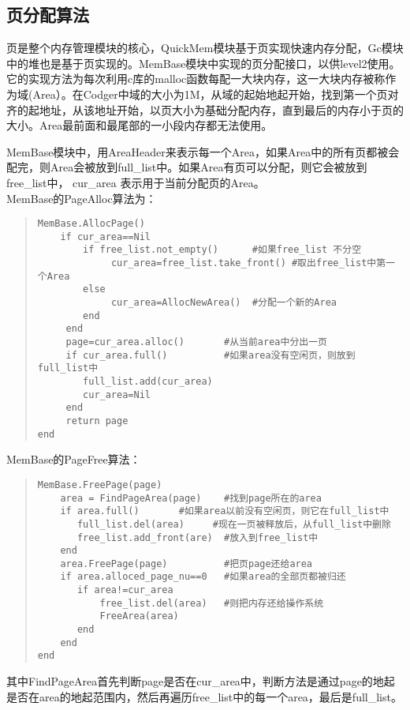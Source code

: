 \subsection{页分配算法}
页是整个内存管理模块的核心，QuickMem模块基于页实现快速内存分配，Gc模块中的堆也是基于页实现的。MemBase模块中实现的页分配接口，以供level2使用。它的实现方法为每次利用c库的malloc函数每配一大块内存，这一大块内存被称作为域(Area）。在Codger中域的大小为1M，从域的起始地起开始，找到第一个页对齐的起地址，从该地址开始，以页大小为基础分配内存，直到最后的内存小于页的大小。Area最前面和最尾部的一小段内存都无法使用。

MemBase模块中，用AreaHeader来表示每一个Area，如果Area中的所有页都被会配完，则Area会被放到full\_list中。如果Area有页可以分配，则它会被放到free\_list中， cur\_area 表示用于当前分配页的Area。 \\
MemBase的PageAlloc算法为：
\begin{quote}
\begin{verbatim}
MemBase.AllocPage()
    if cur_area==Nil
        if free_list.not_empty()      #如果free_list 不分空
             cur_area=free_list.take_front() #取出free_list中第一个Area
        else
             cur_area=AllocNewArea()  #分配一个新的Area
        end
     end 
     page=cur_area.alloc()       #从当前area中分出一页
     if cur_area.full()          #如果area没有空闲页，则放到full_list中
        full_list.add(cur_area)
        cur_area=Nil
     end
     return page
end 
\end{verbatim}
\end{quote}
MemBase的PageFree算法：
\begin{quote}
\begin{verbatim}
MemBase.FreePage(page)
    area = FindPageArea(page)    #找到page所在的area
    if area.full()       #如果area以前没有空闲页，则它在full_list中
       full_list.del(area)     #现在一页被释放后，从full_list中删除
       free_list.add_front(are)  #放入到free_list中
    end
    area.FreePage(page)          #把页page还给area
    if area.alloced_page_nu==0   #如果area的全部页都被归还
       if area!=cur_area        
           free_list.del(area)   #则把内存还给操作系统
           FreeArea(area)
       end
    end
end 
\end{verbatim}
\end{quote}
其中FindPageArea首先判断page是否在cur\_area中，判断方法是通过page的地起是否在area的地起范围内，然后再遍历free\_list中的每一个area，最后是full\_list。

